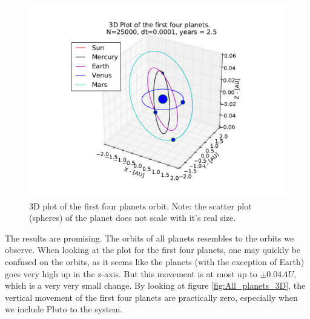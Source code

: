\documentclass[12pt]{article}
\begin{document}

\begin{figure}[!h]
\centering
\includegraphics[width=\linewidth]{Plots/First_planets_3D_plot.pdf}
\caption{3D plot of the first four planets orbit. Note: the scatter plot (spheres) of the planet does not scale with it's real size.}
\label{fig:First4_planets_3D}
\end{figure}

The results are promising. The orbits of all planets resembles to the orbits we observe. When looking at the plot for the first four planets, one may quickly be confused on the orbits, as it seems like the planets (with the exception of Earth) goes very high up in the z-axis. But this movement is at most up to $\pm 0.04AU$, which is a very very small change. By looking at figure \ref{fig:All_planets_3D}, the vertical movement of the first four planets are practically zero, especially when we include Pluto to the system.

\FloatBarrier
\end{document}
